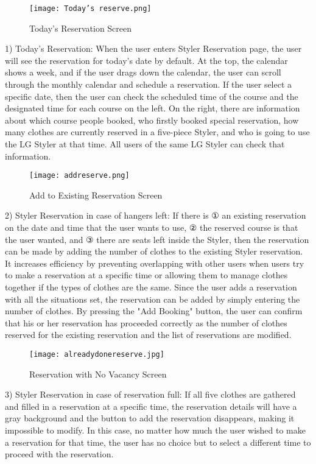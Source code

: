 \documentclass[conference]{IEEEtran}
\begin{document}
\newpage
\begin{figure}[htbp]
\centerline{\texttt{[image: Today's reserve.png]}}
\label{fig}
\caption{Today's Reservation Screen}
\end{figure}
1) Today's Reservation: When the user enters Styler Reservation page, the user will see the reservation for today's date by default. At the top, the calendar shows a week, and if the user drags down the calendar, the user can scroll through the monthly calendar and schedule a reservation.
If the user select a specific date, then the user can check the scheduled time of the course and the designated time for each course on the left. On the right, there are information about which course people booked, who firstly booked special reservation, how many clothes are currently reserved in a five-piece Styler, and who is going to use the LG Styler at that time. All users of the same LG Styler can check that information.\\

\begin{figure}[htbp]
\centerline{\texttt{[image: addreserve.png]}}
\label{fig}
\caption{Add to Existing Reservation Screen}
\end{figure}
2) Styler Reservation in case of hangers left: If there is ① an existing reservation on the date and time that the user wants to use, ② the reserved course is that the user wanted, and ③ there are seats left inside the Styler, then the reservation can be made by adding the number of clothes to the existing Styler reservation. It increases efficiency by preventing overlapping with other users when users try to make a reservation at a specific time or allowing them to manage clothes together if the types of clothes are the same.
Since the user adds a reservation with all the situations set, the reservation can be added by simply entering the number of clothes. By pressing the "Add Booking" button, the user can confirm that his or her reservation has proceeded correctly as the number of clothes reserved for the existing reservation and the list of reservations are modified.\\

\begin{figure}[htbp]
\centerline{\texttt{[image: alreadydonereserve.jpg]}}
\label{fig}
\caption{Reservation with No Vacancy Screen}
\end{figure}
3) Styler Reservation in case of reservation full: If all five clothes are gathered and filled in a reservation at a specific time, the reservation details will have a gray background and the button to add the reservation disappears, making it impossible to modify. In this case, no matter how much the user wished to make a reservation for that time, the user has no choice but to select a different time to proceed with the reservation.\\
\end{document}
